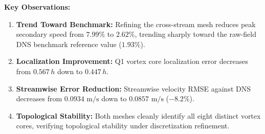 \documentclass[11pt,a4paper]{article}
\begin{document}
\begin{table}[htbp]
\centering
\caption{Discretization sensitivity metrics under cross-stream grid refinement.}
\label{tab:mesh_sensitivity}
\end{table}

\textbf{Key Observations:}
\begin{enumerate}
    \item \textbf{Trend Toward Benchmark:} Refining the cross-stream mesh reduces peak secondary speed from $7.99\%$ to $2.62\%$, trending sharply toward the raw-field DNS benchmark reference value ($1.93\%$).
    \item \textbf{Localization Improvement:} Q1 vortex core localization error decreases from $0.567\,h$ down to $0.447\,h$.
    \item \textbf{Streamwise Error Reduction:} Streamwise velocity RMSE against DNS decreases from $0.0934\text{ m/s}$ down to $0.0857\text{ m/s}$ ($-8.2\%$).
    \item \textbf{Topological Stability:} Both meshes cleanly identify all eight distinct vortex cores, verifying topological stability under discretization refinement.
\end{enumerate}
\end{document}
